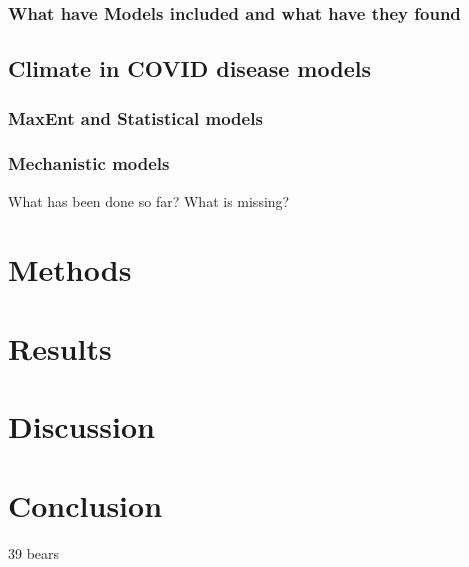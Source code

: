 \documentclass[11pt]{article}
\begin{document}
\subsubsection{What have Models included and what have they found}
\subsection{Climate in COVID disease models}
\subsubsection{MaxEnt and Statistical models}
\subsubsection{Mechanistic models}
What has been done so far?
What is missing?
\section{Methods}
\section{Results}
\section{Discussion}
\section{Conclusion}
39 bears
\clearpage{}
\printbibliography
\end{document}
